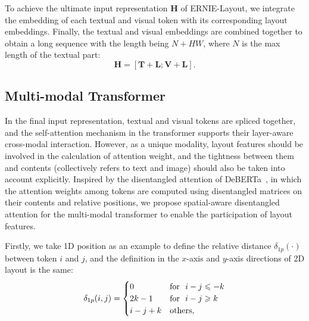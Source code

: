 \documentclass[11pt]{article}
\begin{document}
To achieve the ultimate input representation $\textbf{H}$ of ERNIE-Layout,
we integrate the embedding of each textual and visual token with its corresponding layout embeddings.
Finally, the textual and visual embeddings are combined together to obtain a long sequence with the length being $N+HW$, where $N$ is the max length of the textual part:
\begin{equation}
\textbf{H} = [\textbf{T}+ \textbf{L};\textbf{V}+ \textbf{L}].
\end{equation}


\subsection{Multi-modal Transformer}
\label{sec:muti-modal-transformer}

In the final input representation, textual and visual tokens are spliced together, and the self-attention mechanism in the transformer supports their layer-aware cross-modal interaction.
However, as a unique modality, layout features should be involved in the calculation of attention weight, and the tightness between them and contents (collectively refers to text and image) should also be taken into account explicitly.
Inspired by the disentangled attention of DeBERTa~\cite{he2021deberta}, in which the attention weights among tokens are computed using disentangled matrices on their contents and relative positions, we propose spatial-aware disentangled attention for the multi-modal transformer to enable the participation of layout features.

Firstly, we take 1D position as an example to define the relative distance $\delta_{1p}(\cdot)$ between token $i$ and $j$, and the definition in the $x$-axis and $y$-axis directions of 2D layout is the same:
\begin{equation}
    \delta_{1p}(i, j) =\begin{cases}0 & {\rm for}\ \ i - j \leqslant -k\\2k-1 & {\rm for}\  \ i-j \geqslant k\\i-j+k & {\rm others,}\end{cases}
\end{equation}
\end{document}
